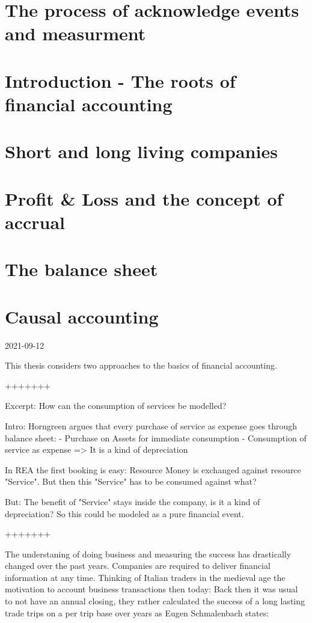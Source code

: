 \section{The process of acknowledge events and measurment}


\section{Introduction - The roots of financial accounting}
\section{Short and long living companies}
\section{Profit \& Loss and the concept of accrual}
\section{The balance sheet}


\section{Causal accounting}

2021-09-12

This thesis considers two approaches to the basics of financial accounting.

+++++++

Excerpt: How can the consumption of services be modelled?

Intro: Horngreen argues that every purchase of service as expense goes through balance sheet:
- Purchase on Assets for immediate consumption
- Consumption of service as expense
=> It is a kind of depreciation

In REA the first booking is easy:
Resource Money is exchanged against resource "Service".
But then this "Service" has to be consumed against what?

But: The benefit of "Service" stays inside the company, is it a kind of depreciation?
So this could be modeled as a pure financial event.

+++++++



The understaning of doing business and measuring the success has drastically changed over the past years.
Companies are required to deliver financial information at any time.
Thinking of Italian traders in the medieval age the motivation to account business transactions then today:
Back then it was usual to not have an annual closing, they rather calculated the success of a long lasting trade trips on a per trip base over years as Eugen Schmalenbach states:

